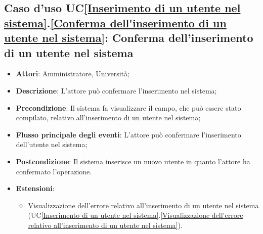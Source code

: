 \subsection{Caso d'uso UC\ref{Inserimento di un utente nel sistema}.\ref{Conferma dell'inserimento di un utente nel sistema}: Conferma dell'inserimento di un utente nel sistema}
\begin{itemize}
	\item \textbf{Attori}: Amministratore, Università;
	\item \textbf{Descrizione}: L'attore può confermare l'inserimento nel sistema;
	\item \textbf{Precondizione}: Il sistema fa visualizzare il campo, che può essere stato compilato, relativo all'inserimento di un utente nel sistema;
	\item \textbf{Flusso principale degli eventi}: L'attore può confermare l'inserimento dell'utente nel sistema;
	\item \textbf{Postcondizione}: Il sistema inserisce un nuovo utente in quanto l'attore ha confermato l'operazione.
	
	\item \textbf{Estensioni}:
	\begin{itemize}
		\item Visualizzazione dell'errore relativo all'inserimento di un utente nel sistema (UC\ref{Inserimento di un utente nel sistema}.\ref{Visualizzazione dell'errore relativo all'inserimento di un utente nel sistema}).
	\end{itemize}
\end{itemize}

